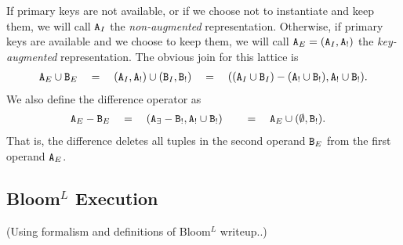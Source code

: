\documentclass{article}
\numberwithin{equation}{section}
\renewcommand{\tt}[1]{\ifmmode\text{\texttt{#1}}\else\texttt{#1}\fi}
\begin{document}
If primary keys are not available, or if we choose not to instantiate and keep them, we will call $\tt{A}_I$ the \emph{non-augmented} representation.
Otherwise, if primary keys are available and we choose to keep them, we will call $\tt{A}_E = (\tt{A}_I, \tt{A}_!)$ the \emph{key-augmented} representation.
The obvious join for this lattice is
\begin{align*}
\tt{A}_E \cup \tt{B}_E \quad=\quad (\tt{A}_I, \tt{A}_!) \cup (\tt{B}_I, \tt{B}_!) \quad=\quad ((\tt{A}_I \cup \tt{B}_I) - (\tt{A}_! \cup \tt{B}_!), \tt{A}_! \cup \tt{B}_!).
\end{align*}
We also define the difference operator
as
\begin{align*}
\tt{A}_E - \tt{B}_E &\quad=\quad (\tt{A}_\exists - \tt{B}_!, \tt{A}_! \cup \tt{B}_!) &&\quad=\quad \tt{A}_E \cup (\emptyset, \tt{B}_!).
\end{align*}
That is, the difference deletes all tuples in the second operand $\tt{B}_E$ from the first operand $\tt{A}_E$.


\subsection{Bloom$^L$ Execution}
\label{sec:prelims:exec}
(Using formalism and definitions of Bloom$^L$ writeup..)
\end{document}
